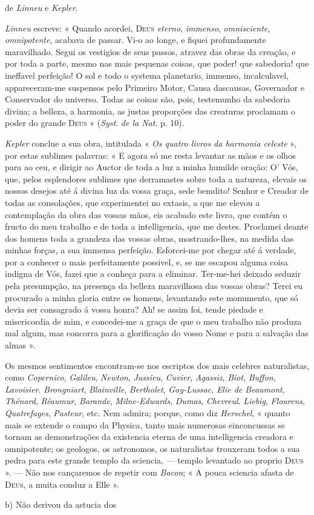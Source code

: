 de \emph{Linneu} e \emph{Kepler}.\par \emph{Linneu} escreve: « Quando acordei, \textsc{Deus} \emph{eterno}, \emph{immenso}, \emph{omnisciente}, \emph{omnipotente}, acabava de passar. Vi-o ao longe, e fiquei profundamente maravilhado. Segui os vestigios de seus passos, atravez das obras da creação, e por toda a parte, mesmo nas mais pequenas coisas, que poder! que sabedoria! que ineffavel perfeição! O sol e todo o systema planetario, immenso, incalculavel, appareceram-me suspensos pelo Primeiro Motor, Causa dascausas, Governador e Conservador do universo. Todas as coisas são, pois, testemunho da sabedoria divina; a belleza, a harmonia, as justas proporções das creaturas proclamam o poder do grande \textsc{Deus} » (\emph{Syst}. \emph{de la Nat}. p. 10).\par \emph{Kepler} conclue a sua obra, intitulada « \emph{Os quatro livros da harmonia celeste} », por estas sublimes palavras: « E agora só me resta levantar as mãos e os olhos para ao ceu, e dirigir ao Auctor de toda a luz a minha humilde oração: O' Vós, que, pelos esplendores sublimes que derramastes sobre toda a natureza, elevais os nossos desejos até á divina luz da vossa graça, sede bemdito! Senhor e Creador de todas as consolações, que experimentei no extasis, a que me elevou a contemplação da obra das vossas mãos, eis acabado este livro, que contém o fructo do meu trabalho e de toda a intelligencia, que me destes. Proclamei deante dos homens toda a grandeza das vossas obras, mostrando-lhes, na medida das minhas forças, a sua immensa perfeição. Esforcei-me por chegar até á verdade, por a conhecer o mais perfeitamente possivel, e, se me escapou alguma coisa indigna de Vós, fazei que a conheça para a eliminar. Ter-me-hei deixado seduzir pela presumpção, na presença da belleza maravilhosa das vossas obras? Terei eu procurado a minha gloria entre os homens, levantando este monumento, que só devia ser consagrado á vossa honra? Ah! se assim foi, tende piedade e misericordia de mim, e concedei-me a graça de que o meu trabalho não produza mal algum, mas concorra para a glorificação do vosso Nome e para a salvação das almas ».\par Os mesmos sentimentos encontram-se nos escriptos dos mais celebres naturalistas, como \emph{Copernico}, \emph{Galileu}, \emph{Newton}, \emph{Jussieu}, \emph{Cuvier}, \emph{Agassiz}, \emph{Biot}, \emph{Buffon}, \emph{Lavoisier}. \emph{Brongniart}, \emph{Blainville}, \emph{Bertholet}, \emph{Gay-Lussac}, \emph{Elie de Beaumont}, \emph{Thénard}, \emph{Réaumur}, \emph{Barande}, \emph{Milne-Edwards}, \emph{Dumas}, \emph{Chevreul}. \emph{Liebig}, \emph{Flourens}, \emph{Quatrefages}, \emph{Pasteur}, etc. Nem admira; porque, como diz \emph{Herschel}, « quanto mais se extende o campo da Physica, tanto mais numerosas einconcussas se tornam as demonstrações da existencia eterna de uma intelligencia creadora e omnipotente; os geologos, os astronomos, os naturalistas trouxeram todos a sua pedra para este grande templo da sciencia, --- templo levantado ao proprio \textsc{Deus} ». --- Não nos cançaremos de repetir com \emph{Bacon}; « A pouca sciencia afasta de \textsc{Deus}, a muita conduz a Elle ».\par b) Não derivou da astucia dos 